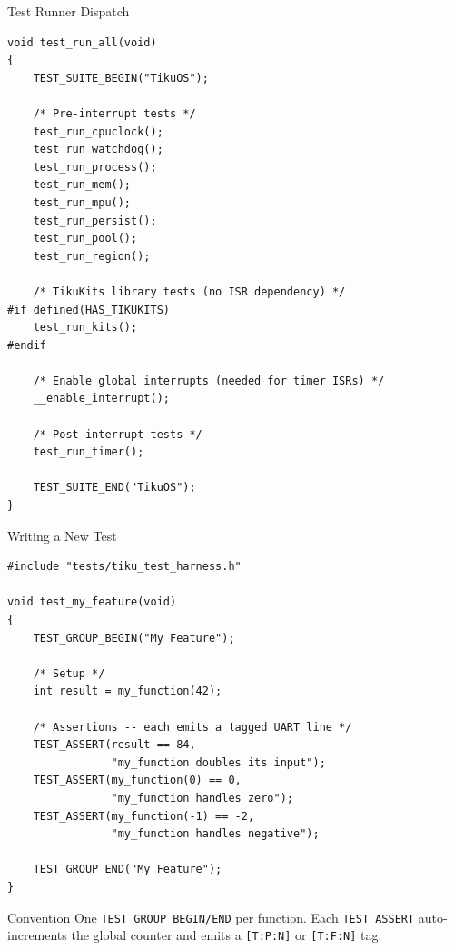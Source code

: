\documentclass[aspectratio=169, 10pt]{beamer}
\begin{document}
\begin{frame}[fragile]{Test Runner Dispatch}
\begin{lstlisting}[style=cstyle, title={tests/test\_runner.c --- main dispatch}]
void test_run_all(void)
{
    TEST_SUITE_BEGIN("TikuOS");

    /* Pre-interrupt tests */
    test_run_cpuclock();
    test_run_watchdog();
    test_run_process();
    test_run_mem();
    test_run_mpu();
    test_run_persist();
    test_run_pool();
    test_run_region();

    /* TikuKits library tests (no ISR dependency) */
#if defined(HAS_TIKUKITS)
    test_run_kits();
#endif

    /* Enable global interrupts (needed for timer ISRs) */
    __enable_interrupt();

    /* Post-interrupt tests */
    test_run_timer();

    TEST_SUITE_END("TikuOS");
}
\end{lstlisting}
\end{frame}

\begin{frame}[fragile]{Writing a New Test}
\begin{lstlisting}[style=cstyle, title={Example: a typical test function}]
#include "tests/tiku_test_harness.h"

void test_my_feature(void)
{
    TEST_GROUP_BEGIN("My Feature");

    /* Setup */
    int result = my_function(42);

    /* Assertions -- each emits a tagged UART line */
    TEST_ASSERT(result == 84,
                "my_function doubles its input");
    TEST_ASSERT(my_function(0) == 0,
                "my_function handles zero");
    TEST_ASSERT(my_function(-1) == -2,
                "my_function handles negative");

    TEST_GROUP_END("My Feature");
}
\end{lstlisting}

\vspace{0.3em}
\begin{block}{Convention}
One \texttt{TEST\_GROUP\_BEGIN/END} per function. Each \texttt{TEST\_ASSERT}
auto-increments the global counter and emits a \texttt{[T:P:N]} or \texttt{[T:F:N]} tag.
\end{block}
\end{frame}
\end{document}

